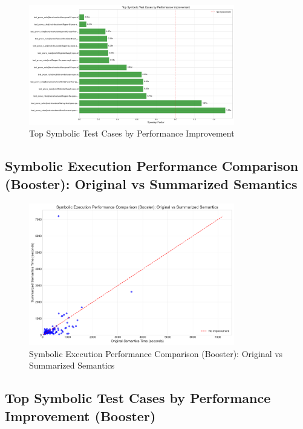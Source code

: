 \documentclass[article]{article}
\begin{document}
\begin{figure}[H]
\centering
\includegraphics[width=0.8\textwidth]{charts/symbolic_test_case_improvement.pdf}
\caption{Top Symbolic Test Cases by Performance Improvement}
\label{fig:symbolic_test_case_improvement}
\end{figure}

\newpage

\subsection{Symbolic Execution Performance Comparison (Booster): Original vs Summarized Semantics}\label{fig:symbolic_booster_performance_scatter}

\begin{figure}[H]
\centering
\includegraphics[width=0.8\textwidth]{charts/symbolic_booster_performance_scatter.pdf}
\caption{Symbolic Execution Performance Comparison (Booster): Original vs Summarized Semantics}
\label{fig:symbolic_booster_performance_scatter}
\end{figure}

\newpage

\subsection{Top Symbolic Test Cases by Performance Improvement (Booster)}\label{fig:symbolic_booster_test_case_improvement}
\end{document}
